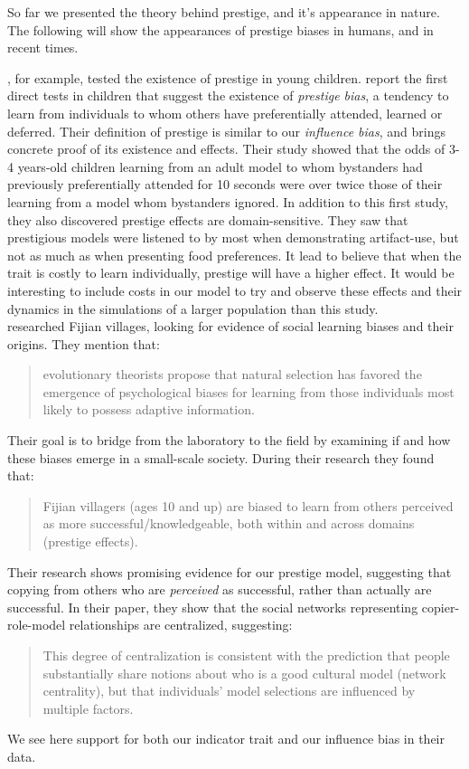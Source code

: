 \documentclass[11pt]{article}
\begin{document}
So far we presented the theory behind prestige, and it's appearance in nature. The following will show the appearances of prestige biases in humans, and in recent times.

\citet{prestige_cultural_learning}, for example, tested the existence of prestige in young children. \citet{prestige_cultural_learning} report the first direct tests in children that suggest the existence of \textit{prestige bias}, a tendency to learn from individuals to whom others have preferentially attended, learned or deferred.
Their definition of prestige is similar to our \textit{influence bias}, and brings concrete proof of its existence and effects. Their study showed that the odds of 3-4 years-old children learning from an adult model to whom bystanders had previously preferentially attended for 10 seconds were over twice those of their learning from a model whom bystanders ignored.
In addition to this first study, they also discovered prestige effects are domain-sensitive. They saw that prestigious models were listened to by most when demonstrating artifact-use, but not as much as when presenting food preferences. It lead \citet{prestige_cultural_learning} to believe that when the trait is costly to learn individually, prestige will have a higher effect. It would be interesting to include costs in our model to try and observe these effects and their dynamics in the simulations of a larger population than this study.\\

\citet{fijian_social_bias} researched Fijian villages, looking for evidence of social learning biases and their origins. They mention that:
\begin{quote}
evolutionary theorists propose that natural selection has favored the emergence of psychological biases for learning from those individuals most likely to possess adaptive information.
\end{quote}
Their goal is to bridge from the laboratory to the field by examining if and how these biases emerge in a small-scale society.
During their research they found that:
\begin{quote}
Fijian villagers (ages 10 and up) are biased to learn from others perceived as more successful/knowledgeable, both within and across domains (prestige effects).
\end{quote}
Their research shows promising evidence for our prestige model, suggesting that copying from others who are \textit{perceived} as successful, rather than actually are successful. In their paper, they show that the social networks representing copier-role-model relationships are centralized, suggesting:
\begin{quote}
This degree of centralization is consistent with the prediction that people substantially share notions about who is a good cultural model (network centrality), but that individuals’ model selections are influenced by multiple factors.
\end{quote}
We see here support for both our indicator trait and our influence bias in their data.\\
\end{document}
